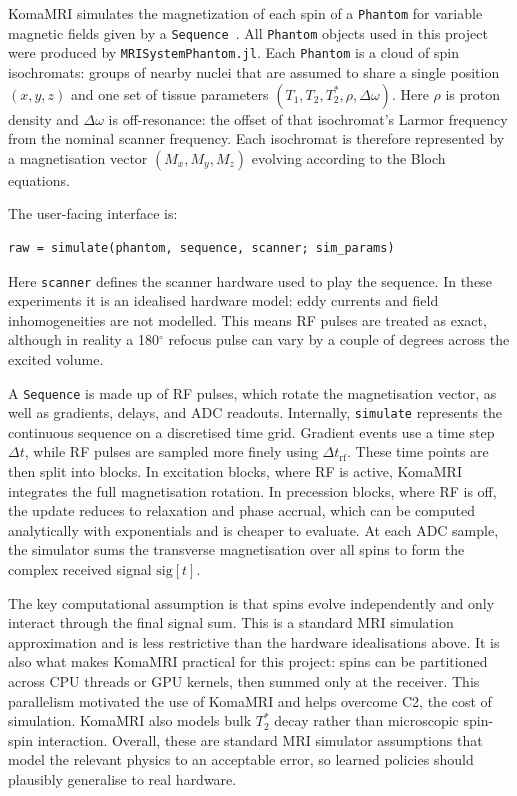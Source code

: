 KomaMRI simulates the magnetization of each spin of a \texttt{Phantom} for
variable magnetic fields given by a \texttt{Sequence}~\cite{komaMRI:23}. All
\texttt{Phantom} objects used in this project were produced by
\texttt{MRISystemPhantom.jl}. Each \texttt{Phantom} is a cloud of spin
isochromats: groups of nearby nuclei that are assumed to share a single
position $(x,y,z)$ and one set of tissue parameters
$(T_1,T_2,T_2^*,\rho,\Delta\omega)$. Here $\rho$ is proton density and
$\Delta\omega$ is off-resonance: the offset of that isochromat's Larmor
frequency from the nominal scanner frequency. Each isochromat is therefore
represented by a magnetisation vector $(M_x,M_y,M_z)$ evolving according to the
Bloch equations.

The user-facing interface is:

\begin{verbatim}
raw = simulate(phantom, sequence, scanner; sim_params)
\end{verbatim}

Here \texttt{scanner} defines the scanner hardware used to play the sequence.
In these experiments it is an idealised hardware model: eddy currents and field
inhomogeneities are not modelled. This means RF pulses are treated as exact,
although in reality a 180$^\circ$ refocus pulse can vary by a couple of degrees
across the excited volume.

A \texttt{Sequence} is made up of RF pulses, which rotate the magnetisation
vector, as well as gradients, delays, and ADC readouts. Internally,
\texttt{simulate} represents the continuous sequence on a discretised time
grid. Gradient events use a time step $\Delta t$, while RF pulses are sampled
more finely using $\Delta t_\mathrm{rf}$. These time points are then split into
blocks. In excitation blocks, where RF is active, KomaMRI integrates the full
magnetisation rotation. In precession blocks, where RF is off, the update
reduces to relaxation and phase accrual, which can be computed analytically
with exponentials and is cheaper to evaluate. At each ADC sample, the simulator
sums the transverse magnetisation over all spins to form the complex received
signal $\mathrm{sig}[t]$.

The key computational assumption is that spins evolve independently and only
interact through the final signal sum. This is a standard MRI simulation
approximation and is less restrictive than the hardware idealisations above. It
is also what makes KomaMRI practical for this project: spins can be partitioned
across CPU threads or GPU kernels, then summed only at the receiver. This
parallelism motivated the use of KomaMRI and helps overcome C2, the cost of
simulation. KomaMRI also models bulk $T_2^*$ decay rather than microscopic
spin-spin interaction. Overall, these are standard MRI simulator assumptions
that model the relevant physics to an acceptable error, so learned policies
should plausibly generalise to real hardware.

